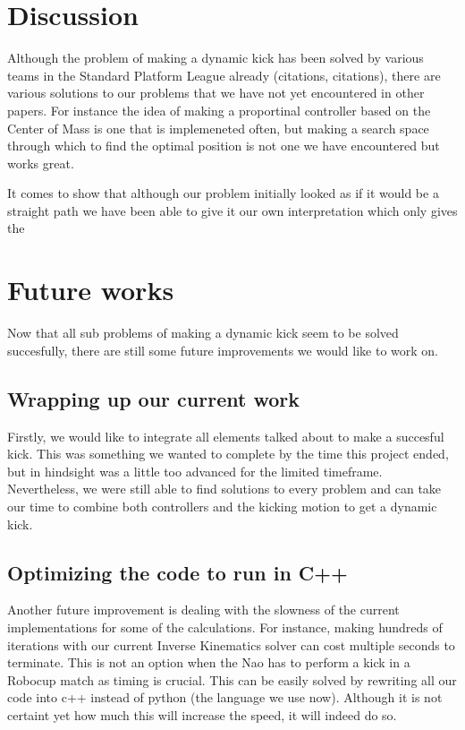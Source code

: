 \documentclass[a4paper]{article}
\begin{document}
\section{Discussion}
Although the problem of making a dynamic kick has been solved by various teams
in the Standard Platform League already (citations, citations), there are various solutions to our
problems that we have not yet encountered in other papers. For instance the idea
of making a proportinal controller based on the Center of Mass is one that is
implemeneted often, but making a search space through which to find the optimal
position is not one we have encountered but works great.

It comes to show that although our problem initially looked as if it would be a
straight path we have been able to give it our own interpretation which only
gives the 

\section{Future works}
Now that all sub problems of making a dynamic kick seem to be solved succesfully, there are still some future improvements we would like to work on.

\subsection{Wrapping up our current work}
Firstly, we would like to integrate all elements talked about to make a succesful kick. This
was something we wanted to complete by the time this project ended, but in
hindsight was a little too advanced for the limited
timeframe. Nevertheless, we were still  able to find
solutions to every problem and can take our time to combine both controllers
and the kicking motion to get a dynamic kick.

\subsection{Optimizing the code to run in C++}
Another future improvement is dealing with the slowness of the current
implementations for some of the calculations. For instance, making hundreds of 
iterations with our current Inverse Kinematics solver can cost multiple
seconds to terminate.
This is not an option when the Nao has to perform a kick in a Robocup match
as timing is crucial. This
can be easily solved by rewriting all our code into c++ instead of python (the
language we use now). Although it is not certaint yet how much this will
increase the speed, it will indeed do so.
\end{document}
